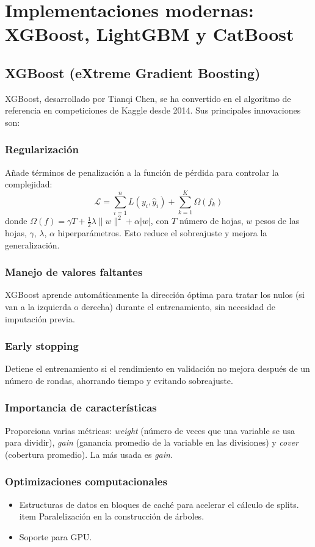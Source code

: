 \documentclass[12pt,a4paper,openany,oneside]{book}
\begin{document}
\section{Implementaciones modernas: XGBoost, LightGBM y CatBoost}

\subsection{XGBoost (eXtreme Gradient Boosting)}
XGBoost, desarrollado por Tianqi Chen, se ha convertido en el algoritmo de referencia en competiciones de Kaggle desde 2014. Sus principales innovaciones son:

\subsubsection{Regularización}
Añade términos de penalización a la función de pérdida para controlar la complejidad:
\[
\mathcal{L} = \sum_{i=1}^n L(y_i, \hat{y}_i) + \sum_{k=1}^K \Omega(f_k)
\]
donde \(\Omega(f) = \gamma T + \frac{1}{2}\lambda \|w\|^2 + \alpha |w|\), con \(T\) número de hojas, \(w\) pesos de las hojas, \(\gamma\), \(\lambda\), \(\alpha\) hiperparámetros. Esto reduce el sobreajuste y mejora la generalización.

\subsubsection{Manejo de valores faltantes}
XGBoost aprende automáticamente la dirección óptima para tratar los nulos (si van a la izquierda o derecha) durante el entrenamiento, sin necesidad de imputación previa.

\subsubsection{Early stopping}
Detiene el entrenamiento si el rendimiento en validación no mejora después de un número de rondas, ahorrando tiempo y evitando sobreajuste.

\subsubsection{Importancia de características}
Proporciona varias métricas: \textit{weight} (número de veces que una variable se usa para dividir), \textit{gain} (ganancia promedio de la variable en las divisiones) y \textit{cover} (cobertura promedio). La más usada es \textit{gain}.

\subsubsection{Optimizaciones computacionales}
\begin{itemize}
    \item Estructuras de datos en bloques de caché para acelerar el cálculo de splits.
    \\item Paralelización en la construcción de árboles.
    \item Soporte para GPU.
\end{itemize}
\end{document}
